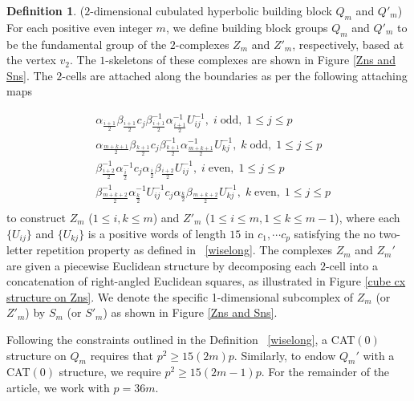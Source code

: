 \documentclass[oneside,11pt,reqno]{amsart}
\theoremstyle{definition}
\newtheorem{defn}[thm]{Definition}
\begin{document}
\begin{defn}\label{block2} ($2$-dimensional cubulated hyperbolic building block $Q_m$ and $Q'_m$)
For each positive even integer $m$, we define building block groups $Q_m$ and $Q'_m$ to be the fundamental group of the $2$-complexes $Z_m$ and $Z'_m$, respectively, based at the vertex $v_2$. The $1$-skeletons of these complexes are shown in Figure \ref{Zns and Sns}. The $2$-cells are attached along the boundaries as per the following attaching maps 

\begin{align*}
& \alpha_{\frac{i+1}{2}} \beta_{\frac{i+1}{2}} c_j \beta^{-1}_{\frac{i+1}{2}} \alpha^{-1}_{\frac{i+1}{2}}U_{ij}^{-1}, \; i \; \text{odd}, \; 1 \leq j \leq p\\
& \alpha_{\frac{m+k+1}{2}} \beta_{\frac{k+1}{2}} c_j \beta^{-1}_{\frac{k+1}{2}} \alpha^{-1}_{\frac{m+k+1}{2}} U_{kj}^{-1}, \; k \; \text{odd}, \; 1 \leq j \leq p\\
& \beta^{-1}_{\frac{i+2}{2}} \alpha^{-1}_{\frac{i}{2}} c_j \alpha_{\frac{i}{2}} \beta_{\frac{i+2}{2}} U_{ij}^{-1}, \; i \; \text{even}, \; 1 \leq j \leq p\\
& \beta^{-1}_{\frac{m+k+2}{2}} \alpha^{-1}_{\frac{k}{2}} U_{ij}^{-1} c_j \alpha_{\frac{k}{2}} \beta_{\frac{m+k+2}{2}} U_{kj}^{-1}, \; k \; \text{even}, \; 1 \leq j \leq p\\
\end{align*}
to construct $Z_m$ ($1 \leq i, k \leq m$) and $Z'_m$ ($1 \leq i \leq m, 1 \leq k \leq m-1$), where each $\{U_{ij}\}$ and $\{U_{kj}\}$ is a positive words of length $15$ in $c_1, \cdots c_{p}$ satisfying the no two-letter repetition property as defined in ~\ref{wiselong}. The complexes $Z_m$ and $Z_m'$ are given a piecewise Euclidean structure by decomposing each $2$-cell into a concatenation of right-angled Euclidean squares, as illustrated in Figure \ref{cube cx structure on Zns}.  We denote the specific 1-dimensional subcomplex of $Z_m$ (or $Z'_m$) by $S_m$ (or $S'_m$) as shown in Figure \ref{Zns and Sns}.





Following the constraints outlined in the Definition ~\ref{wiselong}, a CAT$(0)$ structure on $Q_m$ requires that $p^2 \geq 15(2m)p$.
Similarly, to endow $Q_m'$ with a CAT$(0)$ structure, we require $p^2 \geq 15(2m-1)p$. For the remainder of the article, we work with $p=36m$. 





\end{defn}
\end{document}
